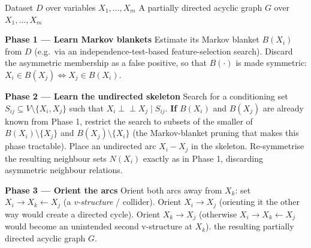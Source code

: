 \begin{algorithm}[h]
\caption{Inferred Causality (our rendering, after Pellet \& Elisseeff (2008) and Alvi (2018))}
\label{alg:inferred-causality}
\begin{algorithmic}[1]
\Require Dataset $D$ over variables $X_1, \ldots, X_m$
\Ensure A partially directed acyclic graph $G$ over $X_1, \ldots, X_m$

\Statex \textbf{Phase 1 --- Learn Markov blankets}
  \State Estimate its Markov blanket $B(X_i)$ from $D$ (e.g.\ via an
         independence-test-based feature-selection search).
\EndFor
{}
    \State Discard the asymmetric membership as a false positive, so that
           $B(\cdot)$ is made symmetric: $X_i \in B(X_j) \Leftrightarrow
           X_j \in B(X_i)$.
  \EndIf
\EndFor

\Statex \textbf{Phase 2 --- Learn the undirected skeleton}
  \State Search for a conditioning set $S_{ij} \subseteq V \setminus \{X_i, X_j\}$
         such that $X_i \perp\!\!\!\perp X_j \mid S_{ij}$. \textbf{If} $B(X_i)$
         and $B(X_j)$ are already known from Phase 1, restrict the search to
         subsets of the smaller of $B(X_i) \setminus \{X_j\}$ and
         $B(X_j) \setminus \{X_i\}$ (the Markov-blanket pruning that makes
         this phase tractable).
    \State Place an undirected arc $X_i - X_j$ in the skeleton.
  \EndIf
\EndFor
\State Re-symmetrise the resulting neighbour sets $N(X_i)$ exactly as in
       Phase 1, discarding asymmetric neighbour relations.

\Statex \textbf{Phase 3 --- Orient the arcs}
  \State Orient both arcs away from $X_k$: set
         $X_i \to X_k \leftarrow X_j$ (a \emph{v-structure} / collider).
\EndFor
\Repeat
    \State Orient $X_i \to X_j$ (orienting it the other way would create a
           directed cycle).
  \EndIf
    \State Orient $X_k \to X_j$ (otherwise $X_i \to X_k \leftarrow X_j$ would
           become an unintended second v-structure at $X_k$).
  \EndIf
{}
\State \Return the resulting partially directed acyclic graph $G$.
\end{algorithmic}
\end{algorithm}

